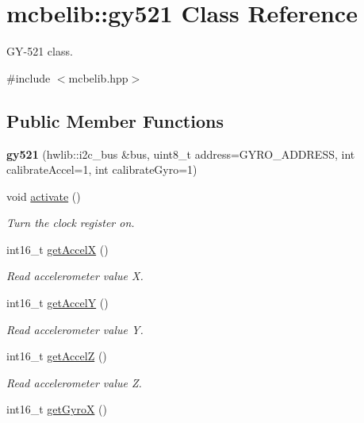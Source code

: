 \hypertarget{classmcbelib_1_1gy521}{}\section{mcbelib\+:\+:gy521 Class Reference}
\label{classmcbelib_1_1gy521}


G\+Y-\/521 class.  




{\ttfamily \#include $<$mcbelib.\+hpp$>$}

\subsection*{Public Member Functions}
\begin{DoxyCompactItemize}
\item 
\mbox{\label{classmcbelib_1_1gy521_a326ed53b38fcbf3d9e87a5f722bf1d57}} 
{\bfseries gy521} (hwlib\+::i2c\+\_\+bus \&bus, uint8\+\_\+t address=G\+Y\+R\+O\+\_\+\+A\+D\+D\+R\+E\+SS, int calibrate\+Accel=1, int calibrate\+Gyro=1)
\item 
void \hyperlink{classmcbelib_1_1gy521_a3d894d6a553ab6ed660886c349f2f7bf}{activate} ()
\begin{DoxyCompactList}\small\item\em Turn the clock register on. \end{DoxyCompactList}\item 
int16\+\_\+t \hyperlink{classmcbelib_1_1gy521_a65218b1467163b223d091ab309133b8c}{get\+AccelX} ()
\begin{DoxyCompactList}\small\item\em Read accelerometer value X. \end{DoxyCompactList}\item 
int16\+\_\+t \hyperlink{classmcbelib_1_1gy521_a57711c636f4541aa442cac6fd9539666}{get\+AccelY} ()
\begin{DoxyCompactList}\small\item\em Read accelerometer value Y. \end{DoxyCompactList}\item 
int16\+\_\+t \hyperlink{classmcbelib_1_1gy521_ad4b00d9882416e17a518b121c3f46b11}{get\+AccelZ} ()
\begin{DoxyCompactList}\small\item\em Read accelerometer value Z. \end{DoxyCompactList}\item 
int16\+\_\+t \hyperlink{classmcbelib_1_1gy521_a1145cda6295287a6cda950c156bcf0d9}{get\+GyroX} ()

\end{DoxyCompactItemize}
